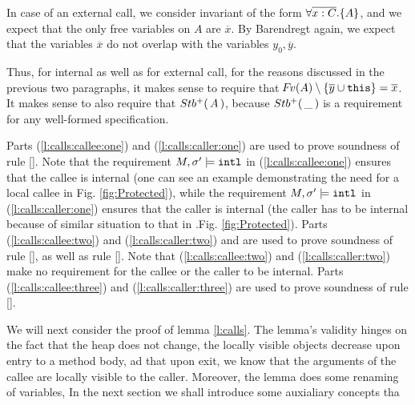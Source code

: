 In case of an external call, we consider invariant of the form ${\forall {\overline {x:C}}.{{\{}}{A}{{\}}}}$, and we
expect that the only free variables on $A$ are    $\overline x$.
By Barendregt again, we expect that the variables $\overline x$ do not overlap with the variables $y_0, \overline y$.


Thus, for internal as well as for external call, for the reasons discussed in the previous two paragraphs, it makes sense to require that  ${\hspace{-1pt}F\hspace{-1pt}}v(A)\setminus\{ {\overline{y}} \cup \mbox{\normalfont{\texttt{this}}} \} =\overline{x}$. 
It makes sense to also require that ${Stb^+(\, A\, )}$, because ${Stb^+(\, \_\, )}$ is a requirement for any well-formed  specification.

 
Parts  (\ref{l:calls:callee:one})  and (\ref{l:calls:caller:one})  are  used to prove soundness of rule {[]}.
  Note that the requirement $M, \sigma' \models \mbox{\normalfont{\texttt{intl}}} $  in (\ref{l:calls:callee:one}) ensures that the callee is internal
  (one can see an example demonstrating the need for a local callee in Fig.  \ref{fig:Protected}),
  while the requirement $M, \sigma' \models \mbox{\normalfont{\texttt{intl}}} $  in   (\ref{l:calls:caller:one}) ensures that the caller is internal
  (the caller has to be internal because of similar situation to that in .Fig.  \ref{fig:Protected}).
Parts
 (\ref{l:calls:callee:two}) and (\ref{l:calls:caller:two}) and are  used to prove soundness of rule {[]},
as well as rule {[]}.
  Note that   (\ref{l:calls:callee:two}) and (\ref{l:calls:caller:two}) make no requirement for the callee or the caller to be internal.  
 Parts
(\ref{l:calls:callee:three}) and (\ref{l:calls:caller:three}) are  used to prove soundness of rule {[]}.

\vspace{.4cm}
We will next consider the proof of lemma  \ref{l:calls}.
The lemma's validity hinges on the fact that the  heap does not change,
 the locally visible objects decrease upon entry to a method body, ad that  upon exit, we know that the arguments of the callee are 
 locally visible to the caller.
Moreover, the lemma does some renaming of variables,
In the next section we shall introduce some auxialiary concepts tha 

\vspace{.2cm}
